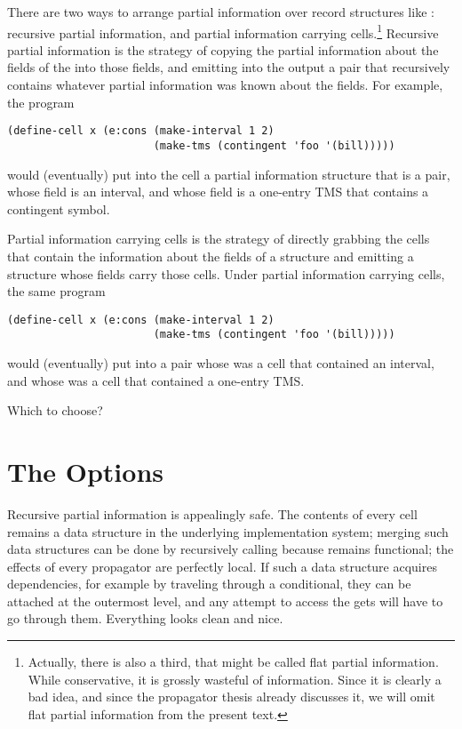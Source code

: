 \documentclass[12pt,letterpaper]{article}
\begin{document}
There are two ways to arrange partial information over record
structures like : recursive partial information, and
partial information carrying cells.\footnote{Actually, there is also a
  third, that might be called flat partial information.  While
  conservative, it is grossly wasteful of information.  Since it is
  clearly a bad idea, and since the propagator thesis already
  discusses it, we will omit flat partial information from the present
  text.}  Recursive partial information is the strategy of copying the
partial information about the fields of the  into those
fields, and emitting into the output a pair that recursively contains
whatever partial information was known about the fields.  For example,
the program
\begin{verbatim}
(define-cell x (e:cons (make-interval 1 2)
                       (make-tms (contingent 'foo '(bill)))))
\end{verbatim}
would (eventually) put into the cell  a partial information
structure that is a pair, whose  field is an interval, and
whose  field is a one-entry TMS that contains a contingent
symbol.

Partial information carrying cells is the strategy of directly
grabbing the cells that contain the information about the fields of a
structure and emitting a structure whose fields carry those cells.
Under partial information carrying cells, the same program
\begin{verbatim}
(define-cell x (e:cons (make-interval 1 2)
                       (make-tms (contingent 'foo '(bill)))))
\end{verbatim}
would (eventually) put into  a pair whose  was a
cell that contained an interval, and whose  was a cell that
contained a one-entry TMS.

Which to choose?

\section{The Options}

Recursive partial information is appealingly safe.  The contents of
every cell remains a data structure in the underlying implementation
system; merging such data structures can be done by recursively
calling  because  remains functional; the
effects of every propagator are perfectly local.  If such a data
structure acquires dependencies, for example by traveling through a
conditional, they can be attached at the outermost level, and any
attempt to access the gets will have to go through them.  Everything
looks clean and nice.
\end{document}
